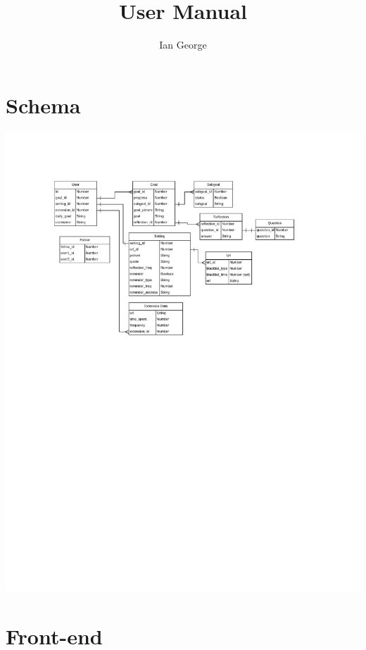 \documentclass[letterpaper, 10 pt]{report}
\begin{document}
\title{User Manual}
\author{Ian George}
\maketitle
\pagestyle{empty}

\tableofcontents
\newpage

\section{Schema}
\includegraphics{RelationalData}
\newpage


\section{Front-end}
\end{document}
